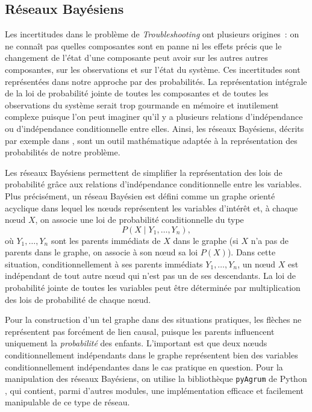 \documentclass[a4paper,11pt]{article}
\theoremstyle{plain}
\begin{document}
\subsection{Réseaux Bayésiens}

Les incertitudes dans le problème de \emph{Troubleshooting} ont plusieurs origines~: on ne connaît pas quelles composantes sont en panne ni les effets précis que le changement de l'état d'une composante peut avoir sur les autres autres composantes, sur les observations et sur l'état du système. Ces incertitudes sont représentées dans notre approche par des probabilités. La représentation intégrale de la loi de probabilité jointe de toutes les composantes et de toutes les observations du système serait trop gourmande en mémoire et inutilement complexe puisque l'on peut imaginer qu'il y a plusieurs relations d'indépendance ou d'indépendance conditionnelle entre elles. Ainsi, les réseaux Bayésiens, décrits par exemple dans \cite{Jensen_2007}, sont un outil mathématique adaptée à la représentation des probabilités de notre problème.

Les réseaux Bayésiens permettent de simplifier la représentation des lois de probabilité grâce aux relations d'indépendance conditionnelle entre les variables. Plus précisément, un réseau Bayésien est défini comme un graphe orienté acyclique dans lequel les nœuds représentent les variables d'intérêt et, à chaque nœud $X$, on associe une loi de probabilité conditionnelle du type
\[
P(X \mid Y_1, \dotsc, Y_n),
\]
où $Y_1, \dotsc, Y_n$ sont les parents immédiats de $X$ dans le graphe (si $X$ n'a pas de parents dans le graphe, on associe à son nœud sa loi $P(X)$). Dans cette situation, conditionnellement à ses parents immédiats $Y_1, \dotsc, Y_n$, un nœud $X$ est indépendant de tout autre nœud qui n'est pas un de ses descendants. La loi de probabilité jointe de toutes les variables peut être déterminée par multiplication des lois de probabilité de chaque nœud.

Pour la construction d'un tel graphe dans des situations pratiques, les flèches ne représentent pas forcément de lien causal, puisque les parents influencent uniquement la \emph{probabilité} des enfants. L'important est que deux nœuds conditionnellement indépendants dans le graphe représentent bien des variables conditionnellement indépendantes dans le cas pratique en question. Pour la manipulation des réseaux Bayésiens, on utilise la bibliothèque \texttt{pyAgrum} de Python \cite{Gonzales_2017}, qui contient, parmi d'autres modules, une implémentation efficace et facilement manipulable de ce type de réseau.
\end{document}
